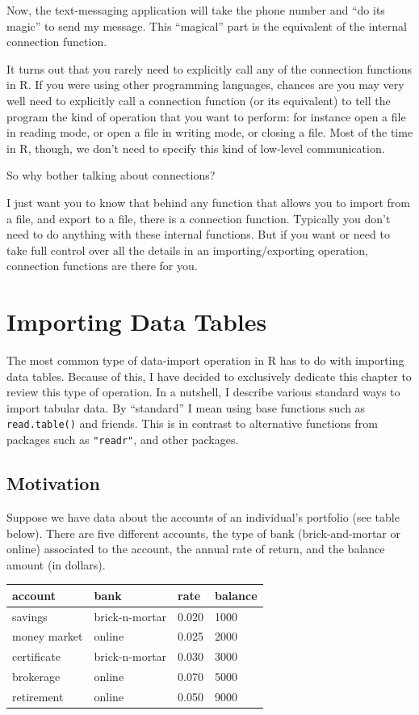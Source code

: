 \documentclass[
]{book}
\begin{document}
Now, the text-messaging application will take the phone number and ``do its
magic'' to send my message. This ``magical'' part is the equivalent of the
internal connection function.

It turns out that you rarely need to explicitly call any of the connection
functions in R. If you were using other programming languages, chances are you
may very well need to explicitly call a connection function (or its equivalent)
to tell the program the kind of operation that you want to perform: for instance
open a file in reading mode, or open a file in writing mode, or closing a file.
Most of the time in R, though, we don't need to specify this kind of low-level
communication.

So why bother talking about connections?

I just want you to know that behind any function that allows you to import from
a file, and export to a file, there is a connection function. Typically you
don't need to do anything with these internal functions. But if you want or need
to take full control over all the details in an importing/exporting operation,
connection functions are there for you.

\hypertarget{import-tables}{%
\chapter{Importing Data Tables}\label{import-tables}}

The most common type of data-import operation in R has to do with importing
data tables. Because of this, I have decided to exclusively dedicate this
chapter to review this type of operation. In a nutshell, I describe various
standard ways to import tabular data. By ``standard'' I mean using base functions
such as \texttt{read.table()} and friends. This is in contrast to alternative functions
from packages such as \texttt{"readr"}, and other packages.

\hypertarget{motivation-7}{%
\section{Motivation}\label{motivation-7}}

Suppose we have data about the accounts of an individual's portfolio (see table
below). There are five different accounts, the type of bank (brick-and-mortar
or online) associated to the account, the annual rate of return, and the
balance amount (in dollars).

\begin{longtable}[]{@{}llll@{}}
\toprule()
account & bank & rate & balance \\
\midrule()
\endhead
savings & brick-n-mortar & 0.020 & 1000 \\
money market & online & 0.025 & 2000 \\
certificate & brick-n-mortar & 0.030 & 3000 \\
brokerage & online & 0.070 & 5000 \\
retirement & online & 0.050 & 9000 \\
\bottomrule()
\end{longtable}
\end{document}
